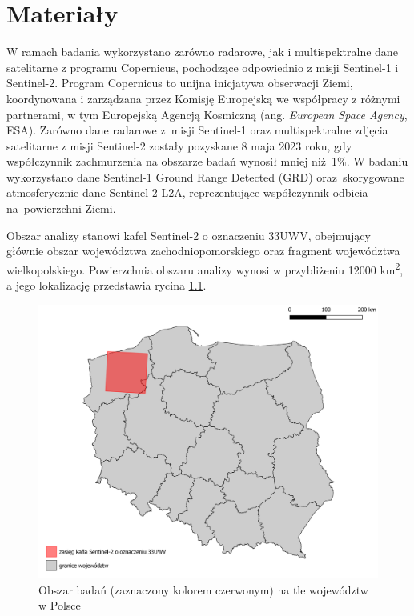 \documentclass{amuthesis}
\begin{document}

\hypertarget{sec-materialy}{%
\chapter{Materiały}\label{sec-materialy}}

W ramach badania wykorzystano zarówno radarowe, jak i multispektralne
dane satelitarne z programu Copernicus, pochodzące odpowiednio z misji
Sentinel-1 i Sentinel-2. Program Copernicus to unijna inicjatywa
obserwacji Ziemi, koordynowana i zarządzana przez Komisję Europejską we
współpracy z różnymi partnerami, w tym Europejską Agencją Kosmiczną
(ang. \emph{European Space Agency}, ESA). Zarówno dane radarowe z~misji
Sentinel-1 oraz multispektralne zdjęcia satelitarne z misji Sentinel-2
zostały pozyskane 8 maja 2023 roku, gdy współczynnik zachmurzenia na
obszarze badań wynosił mniej niż~1\%. W badaniu wykorzystano dane
Sentinel-1 Ground Range Detected (GRD) oraz~skorygowane atmosferycznie
dane Sentinel-2 L2A, reprezentujące współczynnik odbicia na~powierzchni
Ziemi.

Obszar analizy stanowi kafel Sentinel-2 o oznaczeniu 33UWV, obejmujący
głównie obszar województwa zachodniopomorskiego oraz fragment
województwa wielkopolskiego. Powierzchnia obszaru analizy wynosi w
przybliżeniu 12000 km\textsuperscript{2}, a jego lokalizację przedstawia
rycina \ref{fig-rycina-area}.

\begin{figure}[t]

{\centering \includegraphics[width=1\textwidth,height=\textheight]{figures/sen2_extent.png}

}

\caption{\label{fig-rycina-area}Obszar badań (zaznaczony kolorem
czerwonym) na tle województw w Polsce}

\end{figure}
\end{document}
